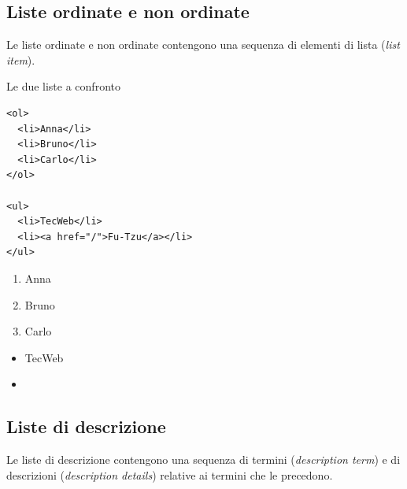 \subsection{Liste ordinate e non ordinate}

Le liste ordinate e non ordinate contengono una sequenza di elementi di lista
 (\textit{list item}).

\begin{esempio}{Le due liste a confronto}
\begin{affianco}[0.5]
\begin{lstlisting}[style=html, name=liste.html]
<ol>
  <li>Anna</li>
  <li>Bruno</li>
  <li>Carlo</li>
</ol>

<ul>
  <li>TecWeb</li>
  <li><a href="/">Fu-Tzu</a></li>
</ul>
\end{lstlisting}
\risultato
\begin{browser}
  \begin{enumerate}[leftmargin=1.8em, itemsep=0pt, topsep=2pt, parsep=0pt]
    \item Anna
    \item Bruno
    \item Carlo
  \end{enumerate}
  \vspace{4pt}
  \begin{itemize}[leftmargin=1.8em, itemsep=0pt, topsep=2pt, parsep=0pt]
    \item TecWeb
    \item {}
  \end{itemize}
\end{browser}
\end{affianco}
\end{esempio}

\subsection{Liste di descrizione}

Le liste di descrizione contengono una sequenza di termini 
(\textit{description term}) e di descrizioni  (\textit{description
details}) relative ai termini che le precedono.

